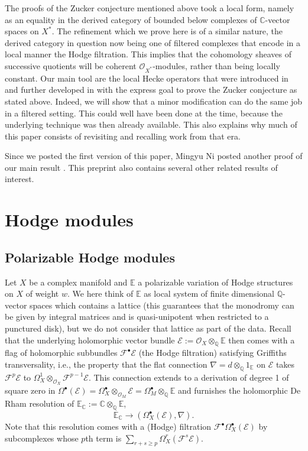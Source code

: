 \documentclass[12pt,letterpaper]{amsart}
\numberwithin{equation}{section}
\def\CC{{\mathbb C}}
\def\EE{{\mathbb E}}
\def\QQ{{\mathbb Q}}
\def\Ecal{{\mathcal E}}
\def\Fcal{{\mathcal F}}
\def\Ocal{{\mathcal O}}
\def\pt{{\scriptscriptstyle\bullet}}
\theoremstyle{remark}
\begin{document}
The proofs of the Zucker conjecture  mentioned above took  a local form, namely as an equality in the derived category 
of bounded below complexes of $\CC$-vector spaces on $X^*$. The refinement which we prove  here  is of a similar 
nature, the derived category in question now being  one of filtered complexes that encode in a local manner the 
Hodge filtration. This implies that  the cohomology sheaves of successive quotients will be coherent $\Ocal_{X^*}$-modules, rather than being  locally constant. Our main tool are  the local Hecke operators that were  introduced in  
\cite{looij:l2} and further developed in \cite{lr} with the express goal to prove the Zucker conjecture as stated above. 
Indeed, we will show   that  a minor modification  can do the same job in a filtered setting.  
This could well have been done at the time, because the underlying technique was then already available.
This also explains why much of this paper consists of revisiting and recalling work from that  era.

Since  we  posted  the first version of this paper, Mingyu Ni posted another proof of our main result  \cite{ni}. This preprint  also contains 
several other related results of interest.


\section{Hodge modules}
\subsection{Polarizable Hodge modules} Let $X$ be a complex  manifold  and $\EE$ a polarizable variation of  Hodge structures 
on $X$ of weight $w$. We here think of $\EE$ as local system of 
finite dimensional  $\QQ$-vector spaces which contains a lattice (this guarantees that the monodromy can 
be given by integral matrices and is quasi-unipotent when restricted to a punctured disk), 
but we do not consider that lattice as part of the data. Recall that the underlying holomorphic vector bundle  
$\Ecal:=\Ocal_X\otimes_\QQ \EE$  then comes with a flag of holomorphic subbundles  $\Fcal^\pt\Ecal$ 
(the Hodge filtration) satisfying  Griffiths transversality, i.e., the property  that  the flat connection 
$\nabla=d\otimes_\QQ 1_\EE$ on $\Ecal$ takes 
$\Fcal^p\Ecal$ to $\Omega^1_X\otimes_{\Ocal_X}\Fcal^{p-1}\Ecal$. This connection extends to
a derivation of degree 1 of square  zero  in $\Omega^\pt(\Ecal)=\Omega^\pt_X\otimes_{\Ocal_M}\Ecal=\Omega^\pt_M\otimes_\QQ \EE$  and furnishes  the holomorphic De Rham resolution of $\EE_\CC:=\CC\otimes_\QQ \EE$,
\[
\EE_\CC\to (\Omega^\pt_X(\Ecal), \nabla).
\]
Note that this resolution  comes with a  (Hodge) filtration $\Fcal^\pt\Omega^\pt_X(\Ecal)$ by subcomplexes whose $p$th term is $\sum_{r+s\ge p}\Omega^r_X(\Fcal^s\Ecal)$.  
\end{document}

